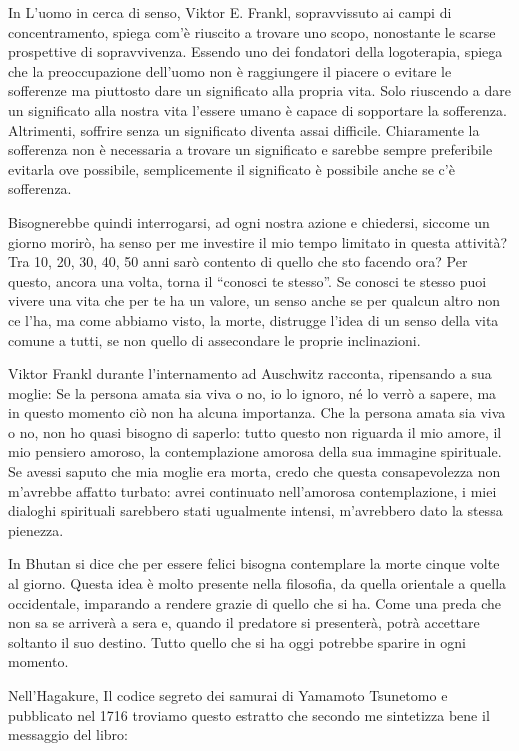 \documentclass[12pt]{book} %
\begin{document}
In L'uomo in cerca di senso, Viktor E. Frankl, sopravvissuto ai campi di
concentramento, spiega com'è riuscito a trovare uno scopo, nonostante le scarse prospettive di
sopravvivenza. Essendo uno dei fondatori della logoterapia, spiega che la preoccupazione dell'uomo non è raggiungere il
piacere o evitare le sofferenze ma piuttosto dare un significato alla propria vita. Solo riuscendo a dare un
significato alla nostra vita l'essere umano è capace di sopportare la sofferenza. Altrimenti,
soffrire senza un significato diventa assai difficile. Chiaramente la sofferenza non è necessaria a trovare un
significato e sarebbe sempre preferibile evitarla ove possibile, semplicemente il significato è possibile anche se c'è
sofferenza.

Bisognerebbe quindi interrogarsi, ad ogni nostra azione e chiedersi, siccome un giorno morirò, ha senso per me investire
il mio tempo limitato in questa attività? Tra 10, 20, 30, 40, 50 anni sarò contento di quello che sto facendo ora?
Per questo, ancora una volta, torna il “conosci te stesso”. Se conosci te
stesso puoi vivere una vita che per te ha un valore, un senso anche se per qualcun altro non ce
l'ha, ma come abbiamo visto, la morte, distrugge l'idea di un senso della
vita comune a tutti, se non quello di assecondare le proprie inclinazioni. 

Viktor Frankl durante l'internamento ad Auschwitz racconta, ripensando a sua moglie: Se la persona
amata sia viva o no, io lo ignoro, né lo verrò a sapere, ma in questo momento ciò non ha alcuna importanza. Che la
persona amata sia viva o no, non ho quasi bisogno di saperlo: tutto questo non riguarda il mio amore, il mio pensiero
amoroso, la contemplazione amorosa della sua immagine spirituale. Se avessi saputo che mia moglie era morta, credo che
questa consapevolezza non m'avrebbe affatto turbato: avrei continuato nell'amorosa contemplazione, i miei dialoghi
spirituali sarebbero stati ugualmente intensi, m'avrebbero dato la stessa pienezza. 

In Bhutan si dice che per essere felici bisogna contemplare la morte cinque volte al giorno. Questa idea è molto
presente nella filosofia, da quella orientale a quella occidentale, imparando a rendere grazie di quello che si ha.
Come una preda che non sa se arriverà a sera e, quando il predatore si presenterà, potrà accettare soltanto il suo
destino. Tutto quello che si ha oggi potrebbe sparire in ogni momento. 

Nell'Hagakure, Il codice segreto dei samurai di Yamamoto Tsunetomo e pubblicato nel
1716 troviamo questo
estratto che secondo me sintetizza bene il messaggio del libro:
\end{document}

